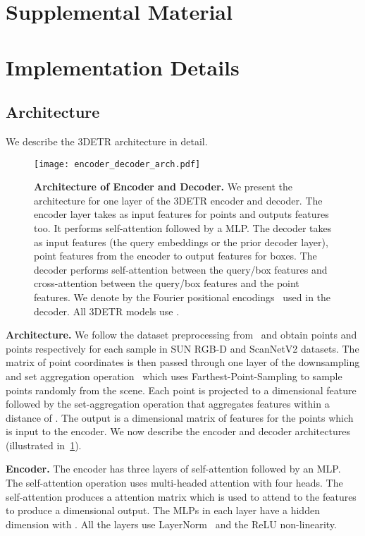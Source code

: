 \documentclass[10pt,twocolumn,letterpaper]{article}
\newcommand{\OURS}{3DETR\xspace}
\newcommand{\sunrgbd}{SUN RGB-D\xspace}
\newcommand{\scannet}{ScanNetV2\xspace}
\begin{document}
\clearpage
\appendix
\section*{Supplemental Material}


\section{Implementation Details}

\subsection{Architecture}
\label{sec:supp_architecture}


We describe the \OURS architecture in detail.

\begin{figure}[!b]
\centering
\texttt{[image: encoder\_decoder\_arch.pdf]}
\caption{\textbf{Architecture of Encoder and Decoder.}
We present the architecture for one layer of the \OURS encoder and decoder.
The encoder layer takes as input  features for  points and outputs  features too.
It performs self-attention followed by a MLP.
The decoder takes as input  features (the query embeddings or the prior decoder layer),  point features from the encoder to output  features for  boxes.
The decoder performs self-attention between the  query/box features and cross-attention between the  query/box features and the  point features.
We denote by  the Fourier positional encodings~\cite{tancik2020fourfeat} used in the decoder.
All \OURS models use .
\label{fig:enc_dec_arch}
}
\end{figure}

\par \noindent \textbf{Architecture.}
We follow the dataset preprocessing from~\cite{qi2019votenet} and obtain  points and  points respectively for each sample in \sunrgbd and \scannet datasets.
The  matrix of point coordinates is then passed through one layer of the downsampling and set aggregation operation~\cite{qi2017pointnet++} which uses Farthest-Point-Sampling to sample  points randomly from the scene.
Each point is projected to a  dimensional feature followed by the set-aggregation operation that aggregates features within a  distance of .
The output is a  dimensional matrix of features for the  points which is input to the encoder.
We now describe the encoder and decoder architectures (illustrated in~\cref{fig:enc_dec_arch}).

\par \noindent \textbf{Encoder.}
The encoder has three layers of self-attention followed by an MLP.
The self-attention operation uses multi-headed attention with four heads.
The self-attention produces a  attention matrix which is used to attend to the  features to produce a  dimensional output.
The MLPs in each layer have a hidden dimension with .
All the layers use LayerNorm~\cite{ba2016layer} and the ReLU non-linearity.
\end{document}
